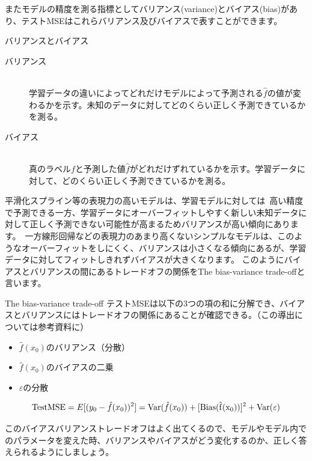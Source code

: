 \documentclass[uplatex]{jsarticle}
\begin{document}
またモデルの精度を測る指標としてバリアンス(variance)とバイアス(bias)があり、テストMSEはこれらバリアンス及びバイアスで表すことができます。
\begin{itembox}[l]{バリアンスとバイアス}
  \begin{description}
    \item [バリアンス]\mbox{}\\
    学習データの違いによってどれだけモデルによって予測される$\hat{f}$の値が変わるかを示す。未知のデータに対してどのくらい正しく予測できているかを測る。
    \item [バイアス]\mbox{}\\
    真のラベル$f$と予測した値$\hat{f}$がどれだけずれているかを示す。学習データに対して、どのくらい正しく予測できているかを測る。
  \end{description}
\end{itembox}
平滑化スプライン等の表現力の高いモデルは、学習モデルに対しては\
高い精度で予測できる一方、学習データにオーバーフィットしやすく新しい未知データに対して正しく予測できない可能性が高まるためバリアンスが高い傾向にあります。\
一方線形回帰などの表現力のあまり高くないシンプルなモデルは、このようなオーバーフィットをしにくく、バリアンスは小さくなる傾向にあるが、学習データに対してフィットしきれずバイアスが大きくなります。
このようにバイアスとバリアンスの間にあるトレードオフの関係をThe bias-variance trade-offと言います。
\begin{itembox}[l]{The bias-variance trade-off}
  テストMSEは以下の3つの項の和に分解でき、バイアスとバリアンスにはトレードオフの関係にあることが確認できる。（この導出については参考資料に）
  \begin{itemize}
    \item $\hat{f}(x_0)$のバリアンス（分散）
    \item $\hat{f}(x_0)$のバイアスの二乗
    \item $\varepsilon$の分散
  \end{itemize}
  $${\rm Test MSE} = E[(y_0 - \hat{f}(x_0))^2] = {\rm Var}(\hat{f}(x_0)) + [{\rm Bias (\hat{f}(x_0))}]^2 + {\rm Var}(\varepsilon)$$
\end{itembox}
このバイアスバリアンストレードオフはよく出てくるので、モデルやモデル内でのパラメータを変えた時、バリアンスやバイアスがどう変化するのか、正しく答えられるようにしましょう。
\end{document}
